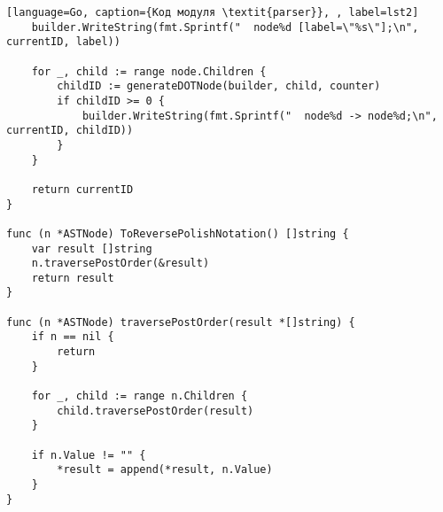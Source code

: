 \begin{appendices}
\begin{lstlisting}[language=Go, caption={Код модуля \textit{parser}}, , label=lst2]
	builder.WriteString(fmt.Sprintf("  node%d [label=\"%s\"];\n", currentID, label))
	
	for _, child := range node.Children {
		childID := generateDOTNode(builder, child, counter)
		if childID >= 0 {
			builder.WriteString(fmt.Sprintf("  node%d -> node%d;\n", currentID, childID))
		}
	}
	
	return currentID
}

func (n *ASTNode) ToReversePolishNotation() []string {
	var result []string
	n.traversePostOrder(&result)
	return result
}

func (n *ASTNode) traversePostOrder(result *[]string) {
	if n == nil {
		return
	}
	
	for _, child := range n.Children {
		child.traversePostOrder(result)
	}
	
	if n.Value != "" {
		*result = append(*result, n.Value)
	}
}

\end{lstlisting}
		
\end{appendices}